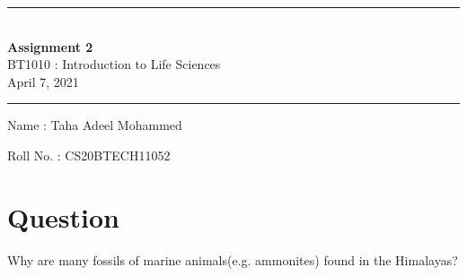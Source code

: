 \documentclass[12pt]{article}
\begin{document}
\begin{center}
\par\noindent\rule{\textwidth}{0.6pt}\\[0.3cm]
\textbf{\LARGE{Assignment 2}}\\[0.3cm]
\Large{BT1010 : Introduction to Life Sciences}\\[0.1cm]
\large{April 7, 2021}\\[0cm]
\par\noindent\rule{\textwidth}{0.6pt}
\end{center}
\noindent
\hspace{0.4cm}Name : Taha Adeel Mohammed
\par \noindent
\hspace{0.4cm}Roll No. : CS20BTECH11052
\section*{Question}
Why are many fossils of marine animals(e.g. ammonites) found in the Himalayas?
\end{document}
